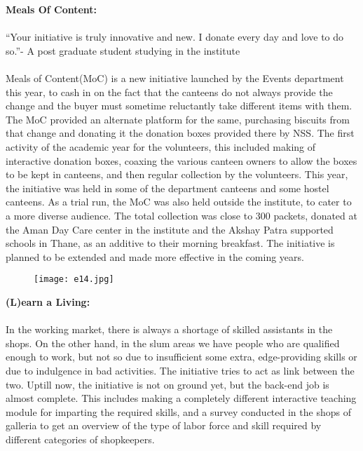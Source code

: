 \noindent \textbf {\Large \linebreak \linebreak \linebreak \linebreak \linebreak \linebreak  Meals Of Content:}\\ \\“Your initiative is truly innovative and new. I donate every day and love to do so.”- A post graduate student studying in the institute \\ \\
Meals of Content(MoC) is a new initiative launched by the Events department this year, to cash in on the fact that the canteens do not always provide the change and the buyer must sometime reluctantly take different items with them. The MoC provided an alternate platform for the same, purchasing biscuits from that change and donating it the donation boxes provided there by NSS. The first activity of the academic year for the volunteers, this included making of interactive donation boxes, coaxing the various canteen owners to allow the boxes to be kept in canteens, and then regular collection by the volunteers. This year, the initiative was held in some of the department canteens and some hostel canteens. As a trial run, the MoC was also held outside the institute, to cater to a more diverse audience. The total collection was close to 300 packets, donated at the Aman Day Care center in the institute and the Akshay Patra supported schools in Thane, as an additive to their morning breakfast. The initiative is planned to be extended and made more effective in the coming years.

\begin{figure}[H]
\centering
\texttt{[image: e14.jpg]}
\end{figure}

\noindent \textbf {\Large \linebreak \linebreak \linebreak  (L)earn a Living:}\\ \\In the working market, there is always a shortage of skilled assistants in the shops. On the other hand, in the slum areas we have people who are qualified enough to work, but not so due to insufficient some extra, edge-providing skills or due to indulgence in bad activities. The initiative tries to act as link between the two. Uptill now, the initiative is not on ground yet, but the back-end job is almost complete. This includes making a completely different interactive teaching module for imparting the required skills, and a survey conducted in the shops of galleria to get an overview of the type of labor force and skill required by different categories of shopkeepers.


